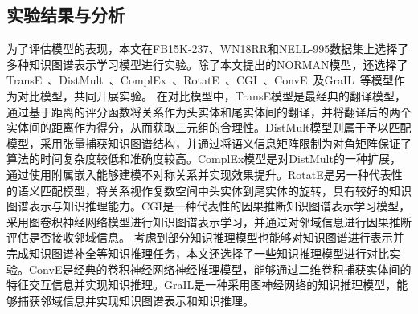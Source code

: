 \documentclass[algorithmlist, AutoFakeBold, AutoFakeSlant, figurelist, tablelist, nomlist, engineering]{seuthesix}
\begin{document}
\subsection{实验结果与分析}
为了评估模型的表现，本文在FB15K-237、WN18RR和NELL-995数据集上选择了多种知识图谱表示学习模型进行实验。除了本文提出的NORMAN模型，还选择了TransE~\cite{bordes2013translating}、DistMult~\cite{yang2015embedding}、ComplEx~\cite{trouillon2016complex}、RotatE~\cite{sun2018rotate}、CGI~\cite{feng2021should}、ConvE~\cite{dettmers2018convolutional}及GraIL~\cite{teru2020inductive}等模型作为对比模型，共同开展实验。
在对比模型中，TransE模型是最经典的翻译模型，通过基于距离的评分函数将关系作为头实体和尾实体间的翻译，并将翻译后的两个实体间的距离作为得分，从而获取三元组的合理性。DistMult模型则属于予以匹配模型，采用张量捕获知识图谱结构，并通过将语义信息矩阵限制为对角矩阵保证了算法的时间复杂度较低和准确度较高。ComplEx模型是对DistMult的一种扩展，通过使用附属嵌入能够建模不对称关系并实现效果提升。RotatE是另一种代表性的语义匹配模型，将关系视作复数空间中头实体到尾实体的旋转，具有较好的知识图谱表示与知识推理能力。CGI是一种代表性的因果推断知识图谱表示学习模型，采用图卷积神经网络模型进行知识图谱表示学习，并通过对邻域信息进行因果推断评估是否接收邻域信息。
考虑到部分知识推理模型也能够对知识图谱进行表示并完成知识图谱补全等知识推理任务，本文还选择了一些知识推理模型进行对比实验。ConvE是经典的卷积神经网络神经推理模型，能够通过二维卷积捕获实体间的特征交互信息并实现知识推理。GraIL是一种采用图神经网络的知识推理模型，能够捕获邻域信息并实现知识图谱表示和知识推理。
\end{document}
